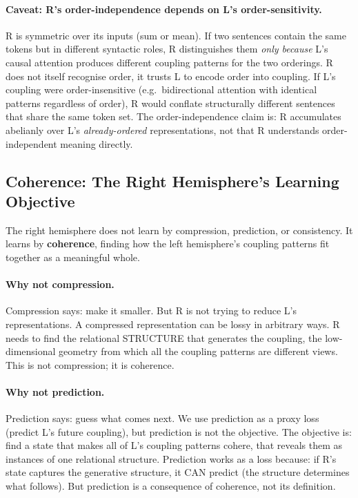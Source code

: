 \documentclass[11pt, a4paper]{article}
\theoremstyle{plain}
\theoremstyle{definition}
\theoremstyle{remark}
\begin{document}
\paragraph{Caveat: R's order-independence depends on L's order-sensitivity.}
R is symmetric over its inputs (sum or mean).
If two sentences contain the same tokens but in different syntactic roles, R distinguishes them \emph{only because} L's causal attention produces different coupling patterns for the two orderings.
R does not itself recognise order, it trusts L to encode order into coupling.
If L's coupling were order-insensitive (e.g.\ bidirectional attention with identical patterns regardless of order), R would conflate structurally different sentences that share the same token set.
The order-independence claim is: R accumulates abelianly over L's \emph{already-ordered} representations, not that R understands order-independent meaning directly.


\subsection{Coherence: The Right Hemisphere's Learning Objective}
\label{sec:coherence}

The right hemisphere does not learn by compression, prediction, or consistency.
It learns by \textbf{coherence}, finding how the left hemisphere's coupling patterns fit together as a meaningful whole.

\paragraph{Why not compression.}
Compression says: make it smaller.
But R is not trying to reduce L's representations.
A compressed representation can be lossy in arbitrary ways.
R needs to find the relational STRUCTURE that generates the coupling, the low-dimensional geometry from which all the coupling patterns are different views.
This is not compression; it is coherence.

\paragraph{Why not prediction.}
Prediction says: guess what comes next.
We use prediction as a proxy loss (predict L's future coupling), but prediction is not the objective.
The objective is: find a state that makes all of L's coupling patterns cohere, that reveals them as instances of one relational structure.
Prediction works as a loss because: if R's state captures the generative structure, it CAN predict (the structure determines what follows).
But prediction is a consequence of coherence, not its definition.
\end{document}
